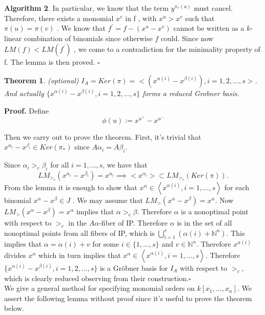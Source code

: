 \documentclass{article}
\theoremstyle{plain}
\newtheorem{theorem}{Theorem}[section]
\theoremstyle{definition}
\newtheorem{algorithm}[theorem]{Algorithm}
\begin{document}
\begin{algorithm}
In particular, we know that the term  $y^{\pi_*(u)}$  must cancel. Therefore, there exists a monomial  $x^{v}$  in  f , with  $x^{u}>x^{v}$  such that  $\pi(u)=\pi(v)$ . We know that  $f^{\prime}=f-\left(x^{u}-x^{v}\right)$  cannot be written as a  $k$-linear combination of binomials since otherwise  $f$  could. Since now  $L M(f)<L M\left(f^{\prime}\right)$ , we come to a contradiction for the minimality property of  f. The lemma is then proved. \hfill $\square$ \\
 
\begin{theorem}(optional) $I_A = Ker(\pi) = <(x^{\alpha(i)}-x^{\beta(i)}),i=1,2,...,s>$. And actually $\{x^{\alpha(i)}-x^{\beta(i)},i=1,2,...,s\}$ forms a reduced Grobner basis. \end{theorem}

\noindent\textbf{Proof.} Define
$$\phi(u):=x^{u^+}-x^{u^-}$$

Then we carry out to prove the theorem. First, it's trivial that $x^{\alpha_i}-x^{\beta_i}\in Ker(\pi_*)$ since $A\alpha_i=A\beta_i$.

Since $\alpha_i >_c \beta_i$ for all $i= 1,...,s$, we have that 
$$ LM_{>_c}(x^{\alpha_i}-x^{\beta_i})=x^{\alpha_i} \implies \big<x^{\alpha_i}\big> \subset LM_{>_c}(Ker(\pi)).
$$From the lemma  it is enough to show that  $x^{\alpha} \in\left\langle x^{\alpha(i)}, i=1, \ldots, s\right\rangle$  for each binomial  $x^{\alpha}-x^{\beta} \in J$ . We may assume that $LM_{>}(x^{\alpha}-x^{\beta})=x^{\alpha}.$ Now  $LM_{>}\left(x^{\alpha}-x^{\beta}\right)=x^{\alpha}$  implies that  $\alpha>_{c} \beta$. Therefore  $\alpha$  is a nonoptimal point with respect to $ >_{c}$  in the  $A \alpha $-fiber of IP. Therefore  $\alpha$  is in the set of all nonoptimal points from all fibers of IP, which is $\bigcup_{i=1}^{s}\left(\alpha(i)+\mathbb{N}^{n}\right)$. This implies that  $\alpha=\alpha(i)+v$  for some  $i \in\{1, \ldots, s\}$  and  $v \in \mathbb{N}^{n}$. Therefore  $x^{\alpha(i)}$  divides  $x^{\alpha}$  which in turn implies that  $x^{\alpha} \in\left\langle x^{\alpha(i)}, i=1, \ldots, s\right\rangle$. Therefore  $\{x^{\alpha(i)}-x^{\beta(i)},i=1,2,...,s\}$  is a Gröbner basis for  $I_A$  with respect to  $>_{c}$, which is clearly reduced observing from their construction.\hfill $\square$ \\

We  give a general method for specifying monomial orders on $k[x_1, . . . , x_n]$.  We assert the following lemma  without proof since it's useful to prove the theorem below.
 

\end{algorithm}
\end{document}
